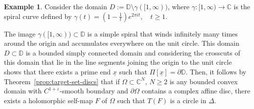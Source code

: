 \documentclass[12pt]{amsart}
\theoremstyle{definition}
\newtheorem{example}[theorem]{Example}
\theoremstyle{remark}
\numberwithin{equation}{section}
\def\C{\mathbb C}
\def\D{\mathbb D}
\begin{document}
\begin{example}\label{ex:example1}
Consider the domain $D:=\D\setminus\gamma([1,\infty))$, where $ \gamma : [1, \infty) \to \mathbb{C} $ is the spiral curve defined by $\gamma(t) = \left(1 - \frac{1}{t}\right) e^{2\pi i t}, \quad t \geq 1.$ 


\begin{center}
	
	\vspace{0.5em}
\end{center}


The image $ \gamma([1, \infty)) \subset \D $ is a simple spiral that winds infinitely many times around the origin and accumulates everywhere on the unit circle. This domain $D\subset \D$ is a bounded simply connected domain and considering the crosscuts of this domain that lie in the line segments joining the origin to the unit circle shows that there exists a prime end $\underline{x}$ such that $\Pi[\underline{x}]=\partial\D$. Then, it follows by {Theorem}~\ref{prop:target-set-discs} that if $\Omega\subset\C^N$, $N\geq 2$ is any bounded convex domain with $C^{1+\varepsilon}$-smooth boundary and $\partial \Omega$ contains a complex affine disc, there exists a holomorphic self-map $F$ of $\Omega$ such that $T(F)$ is a circle in $\Delta$.
\end{example}
\end{document}
